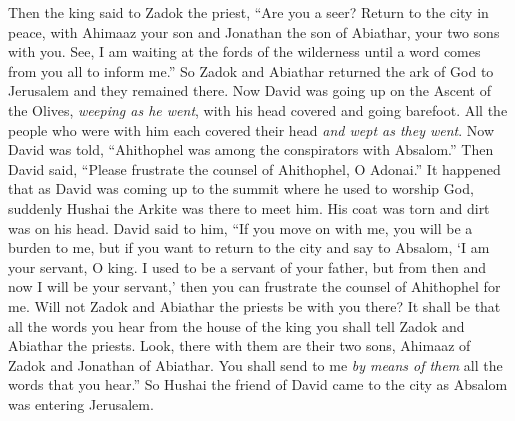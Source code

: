 \begin{biblechapter}
\verse Then the king said to Zadok the priest, “Are you a seer? Return to the city in peace, with Ahimaaz your son and Jonathan the son of Abiathar, your two sons with you.
\verse See, I am waiting at the fords of the wilderness until a word comes from you all to inform me.”
\verse So Zadok and Abiathar returned the ark of God to Jerusalem and they remained there.
 Now David was going up on the Ascent of the Olives, \textit{weeping as he went}, with his head covered and going barefoot. All the people who were with him each covered their head \textit{and wept as they went}.
\verse Now David was told, “Ahithophel was among the conspirators with Absalom.” Then David said, “Please frustrate the counsel of Ahithophel, O Adonai.”
\verse It happened that as David was coming up to the summit where he used to worship God, suddenly Hushai the Arkite was there to meet him. His coat was torn and dirt was on his head.
\verse David said to him, “If you move on with me, you will be a burden to me,
\verse but if you want to return to the city and say to Absalom, ‘I am your servant, O king. I used to be a servant of your father, but from then and now I will be your servant,’ then you can frustrate the counsel of Ahithophel for me.
\verse Will not Zadok and Abiathar the priests be with you there? It shall be that all the words you hear from the house of the king you shall tell Zadok and Abiathar the priests.
\verse Look, there with them are their two sons, Ahimaaz of Zadok and Jonathan of Abiathar. You shall send to me \textit{by means of them} all the words that you hear.”
\verse So Hushai the friend of David came to the city as Absalom was entering Jerusalem.
\end{biblechapter}

